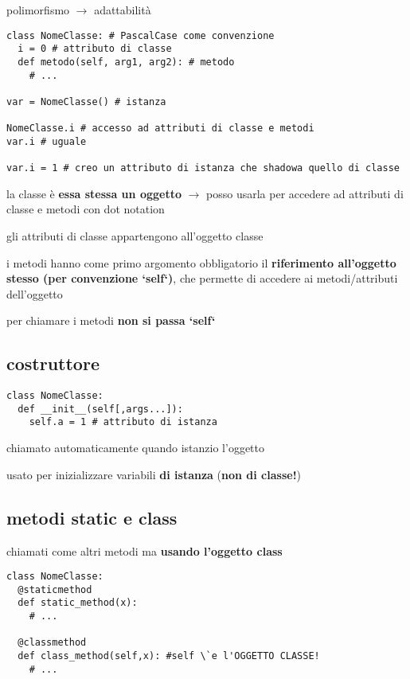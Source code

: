 polimorfismo $\rightarrow$ adattabilit\`a

\begin{verbatim}
class NomeClasse: # PascalCase come convenzione
  i = 0 # attributo di classe
  def metodo(self, arg1, arg2): # metodo
    # ...
  
var = NomeClasse() # istanza

NomeClasse.i # accesso ad attributi di classe e metodi
var.i # uguale

var.i = 1 # creo un attributo di istanza che shadowa quello di classe
\end{verbatim}

la classe \`e \textbf{essa stessa un oggetto} $\rightarrow$ posso usarla per accedere ad attributi di classe e metodi con dot notation

gli attributi di classe appartengono all'oggetto classe

i metodi hanno come primo argomento obbligatorio il \textbf{riferimento all'oggetto stesso (per convenzione `self`)}, che permette di accedere ai metodi/attributi dell'oggetto

per chiamare i metodi \textbf{non si passa `self`}

\subsection{costruttore}

\begin{verbatim}
class NomeClasse:
  def __init__(self[,args...]):
    self.a = 1 # attributo di istanza
\end{verbatim}

chiamato automaticamente quando istanzio l'oggetto

usato per inizializzare variabili \textbf{di istanza} (\textbf{non di classe!})

\subsection{metodi static e class}

chiamati come altri metodi ma \textbf{usando l'oggetto class}

\begin{verbatim}
class NomeClasse:
  @staticmethod
  def static_method(x):
    # ...
    
  @classmethod
  def class_method(self,x): #self \`e l'OGGETTO CLASSE!
    # ...
\end{verbatim}

